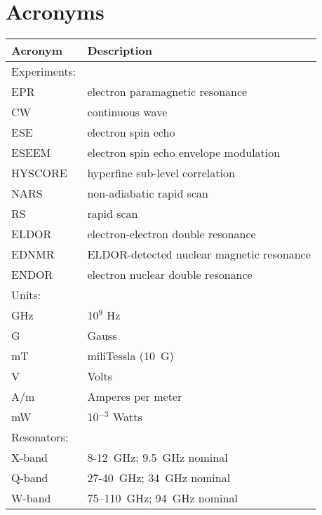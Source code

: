 \documentclass[11pt,a4paper,openany,twoside,english,titlepage=true]{scrbook}
\begin{document}
\listoffigures\newpage

\listoftables\newpage

\newpage
\chapter*{Acronyms}
\begin{table}[ht]
\vspace{-0.5em}
\begin{tabular}{ll}
\textbf{Acronym}     & \textbf{Description} \\ \hline \hline
\rowcolor{LightCyan}
Experiments:    & \\ \hline
EPR             & electron paramagnetic resonance \\
CW              & continuous wave \\
ESE             & electron spin echo \\
ESEEM           & electron spin echo envelope modulation \\
HYSCORE         & hyperfine sub-level correlation \\
NARS            & non-adiabatic rapid scan \\
RS              & rapid scan \\
ELDOR           & electron-electron double resonance \\
EDNMR           & ELDOR-detected nuclear magnetic resonance \\
ENDOR           & electron nuclear double resonance \\ \hline \hline
\rowcolor{LightCyan}
Units:          & \\ \hline
GHz             & 10$^9$ Hz \\
G               & Gauss \\
mT              & miliTessla (10~G) \\
V               & Volts \\
A/m             & Amperes per meter \\
mW              & 10$^{-3}$ Watts \\ \hline \hline
\rowcolor{LightCyan}
Resonators:     & \\ \hline
X-band          & 8-12~GHz; 9.5~GHz nominal \\ 
Q-band          & 27-40~GHz; 34~GHz nominal \\ 
W-band          & 75–110~GHz; 94~GHz nominal \\  

\end{tabular}
\end{table}
\end{document}
